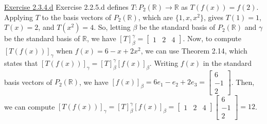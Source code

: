 \documentclass{exam}
\begin{document}
\underline{Exercise 2.3.4.d}
\newline
\newline
Exercise 2.2.5.d defines $T:P_2(\mathbb{R})\to\mathbb{R}$ as $T(f(x))=f(2)$. Applying $T$ to the basis vectors of $P_2(\mathbb{R})$, which are $\{1,x,x^2\}$, gives $T(1)=1$, $T(x)=2$, and $T(x^2)=4$. So, letting $\beta$ be the standard basis of $P_2(\mathbb{R})$ and $\gamma$ be the standard basis of $\mathbb{R}$, we have $[T]_\beta^\gamma=
\begin{bmatrix}
    1 & 2 & 4
\end{bmatrix}$. Now, to compute $[T(f(x))]_\gamma$ when $f(x)=6-x+2x^2$, we can use Theorem 2.14, which states that $[T(f(x))]_\gamma=[T]_\beta^\gamma[f(x)]_\beta$. Writing $f(x)$ in the standard basis vectors of $P_2(\mathbb{R})$, we have $[f(x)]_\beta=6e_1-e_2+2e_3=
\begin{bmatrix}
    6 \\
    -1 \\
    2
\end{bmatrix}$. Then, we can compute $[T(f(x))]_\gamma=[T]_\beta^\gamma[f(x)]_\beta=
\begin{bmatrix}
    1 & 2 & 4
\end{bmatrix}
\begin{bmatrix}
    6 \\
    -1 \\
    2
\end{bmatrix}
=12$.
\newline
\end{document}
